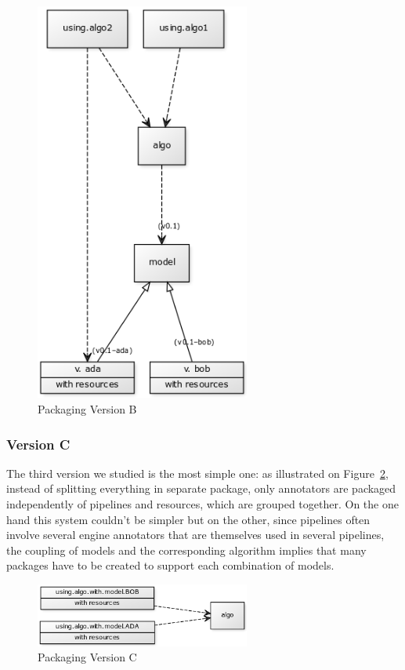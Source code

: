 \documentclass{article}
\begin{document}
\begin{appendices}
\begin{figure}
\centering
\includegraphics[width=200pt]{res/packaging_version_B.png}
\caption{Packaging Version B}
\label{fig:pkgsysB}
\end{figure}


\subsubsection{Version C}

The third version we studied is the most simple one: as illustrated on Figure~\ref{fig:pkgsysC}, instead of splitting everything in separate package, only annotators are packaged independently of pipelines and resources, which are grouped together. On the one hand this system couldn't be simpler but on the other, since pipelines often involve several engine annotators that are themselves used in several pipelines, the coupling of models and the corresponding algorithm implies that many packages have to be created to support each combination of models.


\begin{figure}
\centering
\includegraphics[width=200pt]{res/packaging_version_C.png}
\caption{Packaging Version C}
\label{fig:pkgsysC}
\end{figure}


\end{appendices}
\end{document}
